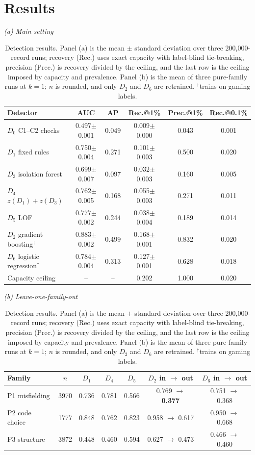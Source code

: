 \documentclass[conference]{IEEEtran}
\begin{document}
\section{Results}
\begin{table}[!t]
\caption{Detection results. Panel (a) is the mean $\pm$ standard deviation
over three 200{,}000-record runs; recovery (Rec.) uses exact capacity with
label-blind tie-breaking, precision (Prec.) is recovery divided by the
ceiling, and the last row is the ceiling imposed by capacity and prevalence.
Panel (b) is the mean of three pure-family runs at $k=1$; $n$ is rounded, and
only $D_2$ and $D_6$ are retrained. $^\dagger$trains on gaming labels.}
\label{tab:results}
\centering
\scriptsize
\textit{(a) Main setting}\\[-2pt]
\setlength{\tabcolsep}{2.4pt}
\begin{tabular}{@{}lccccc@{}}
\toprule
Detector & AUC & AP & Rec.@1\% & Prec.@1\% & Rec.@0.1\% \\
\midrule
$D_0$ C1--C2 checks & 0.497$\pm$0.001 & 0.049 & 0.009$\pm$0.000 & 0.043 & 0.001 \\
$D_1$ fixed rules & 0.750$\pm$0.004 & 0.271 & 0.101$\pm$0.003 & 0.500 & 0.020 \\
$D_3$ isolation forest & 0.699$\pm$0.007 & 0.097 & 0.032$\pm$0.003 & 0.160 & 0.005 \\
$D_4$ $z(D_1)+z(D_3)$ & 0.762$\pm$0.005 & 0.168 & 0.055$\pm$0.003 & 0.271 & 0.011 \\
$D_5$ LOF & 0.777$\pm$0.002 & 0.244 & 0.038$\pm$0.004 & 0.189 & 0.014 \\
$D_2$ gradient boosting$^\dagger$ & 0.883$\pm$0.002 & 0.499 & 0.168$\pm$0.001 & 0.832 & 0.020 \\
$D_6$ logistic regression$^\dagger$ & 0.784$\pm$0.004 & 0.313 & 0.127$\pm$0.001 & 0.628 & 0.018 \\
\midrule
Capacity ceiling & -- & -- & 0.202 & 1.000 & 0.020 \\
\bottomrule
\end{tabular}

\vspace{3pt}
\textit{(b) Leave-one-family-out}\\[-2pt]
\setlength{\tabcolsep}{3pt}
\begin{tabular}{@{}lcccccc@{}}
\toprule
Family & $n$ & $D_1$ & $D_4$ & $D_5$ & $D_2$ in $\rightarrow$ out & $D_6$ in $\rightarrow$ out \\
\midrule
P1 misfielding & 3970 & 0.736 & 0.781 & 0.566 & 0.769 $\rightarrow$ \textbf{0.377} & 0.751 $\rightarrow$ 0.368 \\
P2 code choice & 1777 & 0.848 & 0.762 & 0.823 & 0.958 $\rightarrow$ 0.617 & 0.950 $\rightarrow$ 0.668 \\
P3 structure & 3872 & 0.448 & 0.460 & 0.594 & 0.627 $\rightarrow$ 0.473 & 0.466 $\rightarrow$ 0.460 \\
\bottomrule
\end{tabular}
\end{table}
\end{document}
